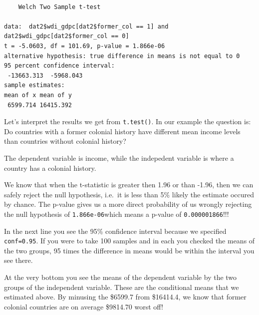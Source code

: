 \documentclass[]{article}
\newenvironment{Shaded}{\begin{snugshade}}{\end{snugshade}}
\newcommand{\DataTypeTok}[1]{\textcolor[rgb]{0.13,0.29,0.53}{#1}}
\newcommand{\DecValTok}[1]{\textcolor[rgb]{0.00,0.00,0.81}{#1}}
\newcommand{\FloatTok}[1]{\textcolor[rgb]{0.00,0.00,0.81}{#1}}
\newcommand{\KeywordTok}[1]{\textcolor[rgb]{0.13,0.29,0.53}{\textbf{#1}}}
\newcommand{\NormalTok}[1]{#1}
\newcommand{\OperatorTok}[1]{\textcolor[rgb]{0.81,0.36,0.00}{\textbf{#1}}}
\newcommand{\StringTok}[1]{\textcolor[rgb]{0.31,0.60,0.02}{#1}}
\begin{document}
\begin{Shaded}
\end{Shaded}

\begin{verbatim}

    Welch Two Sample t-test

data:  dat2$wdi_gdpc[dat2$former_col == 1] and dat2$wdi_gdpc[dat2$former_col == 0]
t = -5.0603, df = 101.69, p-value = 1.866e-06
alternative hypothesis: true difference in means is not equal to 0
95 percent confidence interval:
 -13663.313  -5968.043
sample estimates:
mean of x mean of y 
 6599.714 16415.392 
\end{verbatim}

Let's interpret the results we get from \texttt{t.test()}. In our example the question is: Do countries with a former colonial history have different mean income levels than countries without colonial history?

The dependent variable is income, while the indepedent variable is where a country has a colonial history.

We know that when the t-statistic is greater then 1.96 or than -1.96, then we can safely reject the null hypothesis, i.e.~it is less than 5\% likely the estimate occured by chance. The p-value gives us a more direct probability of us wrongly rejecting the null hypothesis of \texttt{1.866e-06}which means a p-value of \texttt{0.000001866}!!!

In the next line you see the 95\% confidence interval because we specified \texttt{conf=0.95}. If you were to take 100 samples and in each you checked the means of the two groups, 95 times the difference in means would be within the interval you see there.

At the very bottom you see the means of the dependent variable by the two groups of the independent variable. These are the conditional means that we estimated above. By minusing the \$6599.7 from \$16414.4, we know that former colonial countries are on average \$9814.70 worst off!
\end{document}
